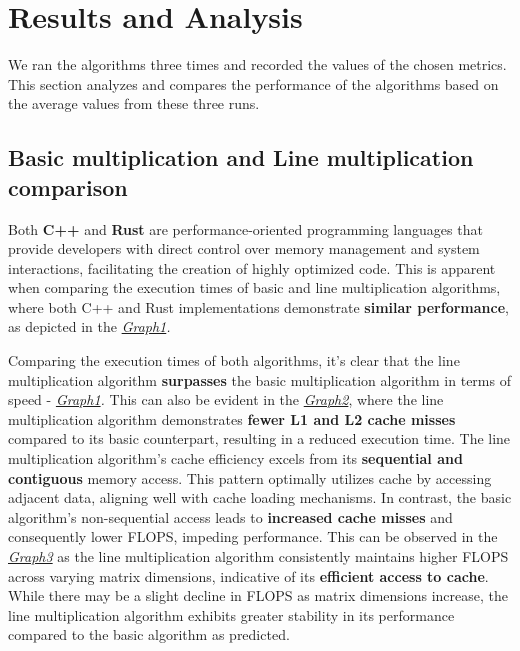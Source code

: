 \section{Results and Analysis}
We ran the algorithms three times
and recorded the values of the chosen
metrics. This section analyzes and
compares the performance of the
algorithms based on the average
values from these three runs.

\subsection{Basic multiplication and Line multiplication comparison}
Both \textbf{C++} and \textbf{Rust} are performance-oriented programming languages
that provide developers with direct control over memory
management and system interactions, facilitating the
creation of highly optimized code. This is apparent
when comparing the execution times of basic and line
multiplication algorithms, where both C++ and Rust
implementations demonstrate \textbf{similar performance}, as
depicted in the \textit{\hyperref[graph:BLG1]{Graph1}.}

Comparing the execution times of both algorithms,
it's clear that the line multiplication algorithm
\textbf{surpasses} the basic multiplication algorithm in
terms of speed - \textit{\hyperref[graph:BLG1]{Graph1}.} This can also be
evident in the \textit{\hyperref[graph:BLG2]{Graph2}},
where the line multiplication algorithm demonstrates
\textbf{fewer L1 and L2 cache misses} compared to its basic
counterpart, resulting in a reduced execution time.
The line multiplication algorithm's cache efficiency excels from its
\textbf{sequential and contiguous} memory access. This pattern optimally
utilizes cache by accessing adjacent data, aligning well with
cache loading mechanisms. In contrast, the basic algorithm's
non-sequential access leads to \textbf{increased cache misses} and
consequently lower FLOPS, impeding performance.
This can be observed in the \textit{\hyperref[graph:BLG3]{Graph3}}
as the line multiplication algorithm
consistently maintains higher FLOPS across varying
matrix dimensions, indicative of its \textbf{efficient
    access to cache}. While there may be a
slight decline in FLOPS as matrix dimensions increase, the
line multiplication algorithm exhibits
greater stability in its performance compared to the
basic algorithm as predicted.

